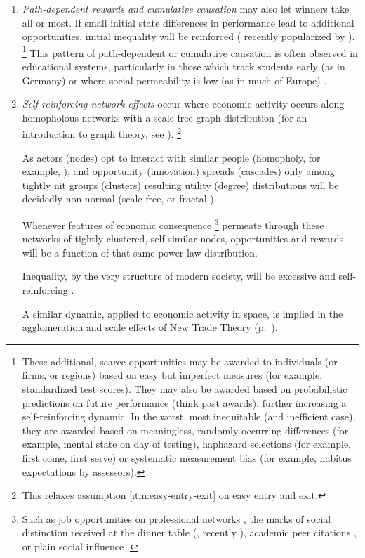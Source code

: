 \begin{enumerate}
	\item {} \label{sec:cumulative-causation}
	\emph{Path-dependent rewards and cumulative causation} may also let winners take all or most.
	If small initial state differences in performance lead to additional opportunities, initial inequality will be reinforced (\citealt{Jackson1968, Merton1988} recently popularized by \citealt{Gladwell}).
	\footnote{
		These additional, scarce opportunities may be awarded to individuals (or firms, or regions) based on easy but imperfect measures (for example, standardized test scores).
		They may also be awarded based on probabilistic predictions on future performance (think past awards), further increasing a self-reinforcing dynamic.
		In the worst, most inequitable (and inefficient case), they are awarded based on meaningless, randomly occurring differences (for example, mental state on day of testing), haphazard selections (for example, first come, first serve) or systematic measurement bias (for example, habitus expectations by assessors).
	}
	This pattern of path-dependent or cumulative causation is often observed in educational systems, particularly in those which track students early (as in Germany) or where social permeability is low (as in much of Europe) \citep{OECD2006}.

	\item {} \label{sec:network-effects} \emph{Self-reinforcing network effects}
	occur where economic activity occurs along homopholous networks with a scale-free graph distribution (for an introduction to graph theory, see \citealt{Kleinberg-2009-oz}).
	\footnote{
		This relaxes  assumption \ref{itm:easy-entry-exit} on \hyperref[itm:easy-entry-exit]{easy entry and exit}.
	}

	As actors (nodes) opt to interact with similar people (homopholy, for example, \citealt{Mcpherson2001}), and opportunity (innovation) spreads (cascades) only among tightly nit groups (clusters) \citep{Bass1969} resulting utility (degree) distributions will be decidedly non-normal (scale-free, or fractal \citep{Mandelbrot2004}).

	Whenever features of economic consequence
	\footnote{
		Such as job opportunities on professional networks \citep{Benkler2006}, the marks of social distinction received at the dinner table (\citealt{Bourdieu-1984-aa}, recently \citealt{Hartmann2002}), academic peer citations \citep{Jackson1968, Merton1988}, or plain social influence \citep{Asch}.
	}
	permeate through these networks of tightly clustered, self-similar nodes, opportunities and rewards will be a function of that same power-law distribution.

	Inequality, by the very structure of modern society, will be excessive and self-reinforcing \citep{Cozzi2009,Keller2005,Andriani2007}.

	A similar dynamic, applied to economic activity in space, is implied in the agglomeration and scale effects of \hyperref[sec:NTT]{New Trade Theory} (p.~\pageref{sec:NTT}).
\end{enumerate}

